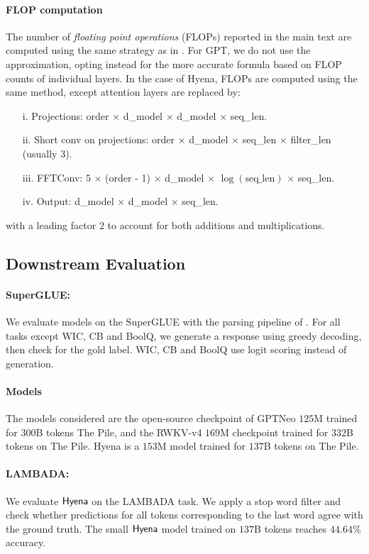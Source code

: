 \paragraph{FLOP computation}
%
The number of \textit{floating point operations} (FLOPs) reported in the main text are computed using the same strategy as in \citep{hoffmann2022training}. For GPT, we do not use the approximation, opting instead for the more accurate formula based on FLOP counts of individual layers. In the case of {\sf Hyena}, FLOPs are computed using the same method, except attention layers are replaced by:
\begin{itemize}
    \item[i.] Projections: order $\times$ d\_model $\times$ d\_model $\times$ seq\_len.
    \item[ii.] Short conv on projections: order $\times$ d\_model $\times$ seq\_len $\times$ filter\_len (usually $3$).
    \item[iii.] FFTConv: $5$ $\times$ (order - 1) $\times$ d\_model $\times$ $\log(\text{seq\_len})$
    $\times$ seq\_len.
    \item[iv.] Output: d\_model $\times$ d\_model $\times$ seq\_len.
\end{itemize}
with a leading factor $2$ to account for both additions and multiplications. 
%

\subsection{Downstream Evaluation}
%
\paragraph{SuperGLUE:} We evaluate models on the SuperGLUE \citep{wang2019superglue} with the parsing pipeline of \citep{arora2022ask}. For all tasks except WIC, CB and BoolQ, we generate a response using greedy decoding, then check for the gold label. WIC, CB and BoolQ use logit scoring instead of generation. 

\paragraph{Models}
The models considered are the open-source checkpoint of GPTNeo $125$M trained for $300$B tokens {\sc The Pile}, and the RWKV-v4 $169$M checkpoint trained for $332$B tokens on {\sc The Pile}. {\sf Hyena} is a $153$M model trained for $137$B tokens on {\sc The Pile}.
%
\paragraph{LAMBADA:} We evaluate ${\sf Hyena}$ on the LAMBADA \citep{paperno2016lambada} task. We apply a stop word filter and check whether predictions for all tokens corresponding to the last word agree with the ground truth. The small ${\sf Hyena}$ model trained on $137$B tokens reaches $44.64\%$ accuracy. 

